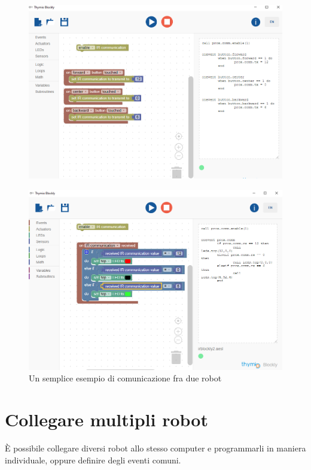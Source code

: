 \documentclass[12pt]{article}
\begin{document}
	\begin{figure}[H]
		\includegraphics[width=\textwidth]{img/blocklyIR1.png}
		\label{blocklyIR1}
	\end{figure}
		
	\begin{figure}[H]
		\includegraphics[width=\textwidth]{img/blocklyIR2.png}
		\caption{Un semplice esempio di comunicazione fra due robot}
		\label{blocklyIR2}
	\end{figure}
	
	
\section{Collegare multipli robot}\label{multi-robot}

	È possibile collegare diversi robot allo stesso computer e programmarli in maniera individuale, oppure definire degli eventi comuni.
	
\end{document}
